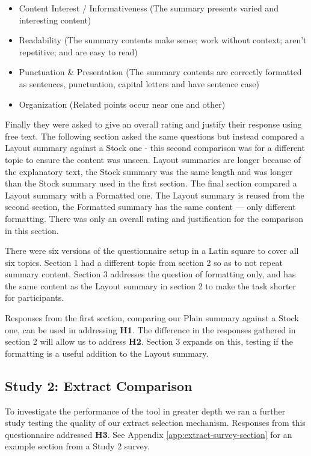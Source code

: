       \begin{itemize}
        \item{Content Interest / Informativeness (The summary presents varied and interesting content)}
        \item{Readability (The summary contents make sense; work without context; aren't repetitive; and are easy to read)}
        \item{Punctuation \& Presentation (The summary contents are correctly formatted as sentences, punctuation, capital letters and have sentence case)}
        \item{Organization (Related points occur near one and other)}
      \end{itemize}

      Finally they were asked to give an overall rating and justify their response using free text. The following section asked the same questions but instead compared a Layout summary against a Stock one - this second comparison was for a different topic to ensure the content was unseen. Layout summaries are longer because of the explanatory text, the Stock summary was the same length and was longer than the Stock summary used in the first section. The final section compared a Layout summary with a Formatted one. The Layout summary is reused from the second section, the Formatted summary has the same content --- only different formatting. There was only an overall rating and justification for the comparison in this section.

      There were six versions of the questionnaire setup in a Latin square to cover all six topics. Section 1 had a different topic from section 2 so as to not repeat summary content. Section 3 addresses the question of formatting only, and has the same content as the Layout summary in section 2 to make the task shorter for participants.

      Responses from the first section, comparing our Plain summary against a Stock one, can be used in addressing \textbf{H1}. The difference in the responses gathered in section 2 will allow us to address \textbf{H2}. Section 3 expands on this, testing if the formatting is a useful addition to the Layout summary.

    \tocless\subsection{Study 2: Extract Comparison}
    To investigate the performance of the tool in greater depth we ran a further study testing the quality of our extract selection mechanism. Responses from this questionnaire addressed \textbf{H3}. See Appendix \ref{app:extract-survey-section} for an example section from a Study 2 survey.


